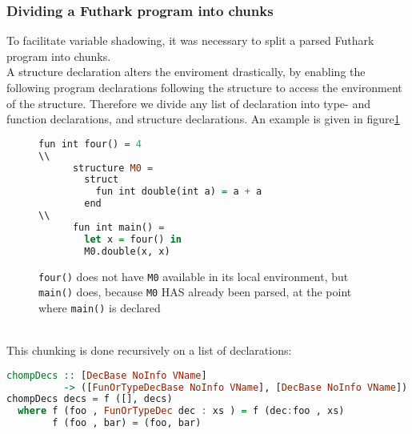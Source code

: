 \subsubsection{Dividing a Futhark program into chunks}
To facilitate variable shadowing, it was necessary to split a parsed Futhark
program into chunks.
\\
A structure declaration alters the enviroment drastically, by enabling the
following program declarations following the structure to access the environment
of the structure.
Therefore we divide any list of declaration into type- and function
declarations, and structure declarations.
An example is given in figure\ref{chunks}
\begin{figure}\label{chunks}
  \begin{tcolorbox}
    \begin{lstlisting}[language=Haskell]
      fun int four() = 4
\\
      structure M0 =
        struct
          fun int double(int a) = a + a
        end
\\
      fun int main() =
        let x = four() in
        M0.double(x, x)
  \end{lstlisting}
  \texttt{four()} does not have \texttt{M0} available in its local environment, but
    \texttt{main()} does, because \texttt{M0} HAS already been parsed, at the point where
    \texttt{main()} is declared
  \end{tcolorbox}
\end{figure}
\\
This chunking is done recursively on a list of declarations:
\begin{lstlisting}[language=Haskell]
chompDecs :: [DecBase NoInfo VName]
          -> ([FunOrTypeDecBase NoInfo VName], [DecBase NoInfo VName])
chompDecs decs = f ([], decs)
  where f (foo , FunOrTypeDec dec : xs ) = f (dec:foo , xs)
        f (foo , bar) = (foo, bar)
\end{lstlisting}

